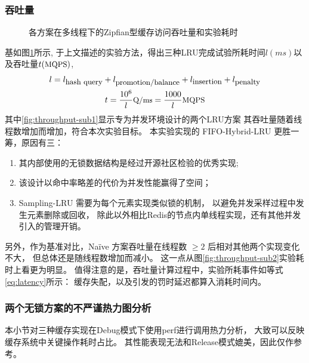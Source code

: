 \subsubsection{吞吐量}

\begin{figure}
    \centering
    \caption{各方案在多线程下的Zipfian型缓存访问吞吐量和实验耗时}
    \label{fig:throughput}
\end{figure}

基如图\ref{fig:throughput}所示, 于上文描述的实验方法，得出三种LRU完成试验所耗时间$l(ms)$以及吞吐量$t(\mbox{\small MQPS})$, 
\begin{gather}
    l = l_{\mbox{\small hash query}} + l_{\mbox{\small promotion/balance}} + l_{\mbox{\small insertion}} + l_{\mbox{\small penalty}} \label{eq:latency}\\
    t = \frac{10^6}{l} \mbox{\small Q/ms} = \frac{1000}{l} \mbox{\small MQPS}
\end{gather}
其中\ref{fig:throughput-sub1}显示专为并发环境设计的两个LRU方案
其吞吐量随着线程数增加而增加，符合本次实验目标。
本实验实现的 FIFO-Hybrid-LRU 更胜一筹，原因有三：
\begin{enumerate}
    \item 其内部使用的无锁数据结构是经过开源社区检验的优秀实现;
    \item 该设计以命中率略差的代价为并发性能赢得了空间；
    \item Sampling-LRU 需要为每个元素实现类似锁的机制，
        以避免并发采样过程中发生元素删除或回收，
        除此以外相比Redis的节点内单线程实现，还有其他并发引入的管理开销。
\end{enumerate}
另外，作为基准对比，Na\"{i}ve 方案吞吐量在线程数 $\geq 2$ 后相对其他两个实现变化不大，
但总体还是随线程数增加而减小。
这一点从图\ref{fig:throughput-sub2}实验耗时上看更为明显。
值得注意的是，吞吐量计算过程中，实验所耗事件如等式\ref{eq:latency}所示： 
缓存失配，以及引发的罚时延迟都算入消耗时间内。

\subsubsection{两个无锁方案的不严谨热力图分析}

本小节对三种缓存实现在Debug模式下使用perf进行调用热力分析，
大致可以反映缓存系统中关键操作耗时占比。
其性能表现无法和Release模式媲美，因此仅作参考。

